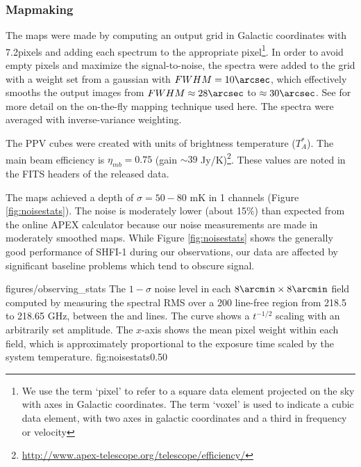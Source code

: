 \subsubsection{Mapmaking}
The maps were made by computing an output grid in Galactic coordinates with
7.2\arcsec pixels and adding each spectrum to the appropriate pixel\footnote{We
use the term `pixel' to refer to a square data element projected on the sky
with axes in Galactic coordinates.  The term `voxel' is used to indicate a cubic data
element, with two axes in galactic coordinates and a third in frequency or
velocity}.  In order
to avoid empty pixels and maximize the signal-to-noise, the spectra were added
to the grid with a weight set from a gaussian with $FWHM=10\arcsec$, which
effectively smooths the output images from $FWHM\approx28\arcsec$ to
$\approx30\arcsec$.  See \citet{Mangum2007a} for more detail on the on-the-fly
mapping technique used here.  The spectra were averaged with inverse-variance
weighting.



The PPV cubes were created with units of brightness temperature ($T_A^*$).  The
main beam efficiency is $\eta_{mb} = 0.75$ (gain $\sim39$
Jy/K)\footnote{\url{http://www.apex-telescope.org/telescope/efficiency/}}.
These values are noted in the FITS headers of the released data.

The maps achieved a depth of $\sigma=50-80$ mK in 1 \kms channels (Figure
\ref{fig:noisestats}).  The noise is moderately lower (about 15\%) than
expected from the online APEX calculator because our noise measurements are
made in moderately smoothed maps.  While Figure \ref{fig:noisestats} shows the
generally good performance of SHFI-1 during our observations, our data are
affected by significant baseline problems which tend to obscure signal.

\Figure
{figures/observing_stats}
{The $1-\sigma$ noise level in each $8\arcmin\times8\arcmin$ field
computed by measuring the spectral RMS over a 200 \kms line-free region
from 218.5 to 218.65 GHz, between the \threetwoone and \threetwotwo lines.
The curve shows a $t^{-1/2}$ scaling with an arbitrarily set amplitude.  The
$x$-axis shows the mean pixel weight within each field, which is approximately
proportional to the exposure time scaled by the system temperature.}
{fig:noisestats}{0.5}{0}


